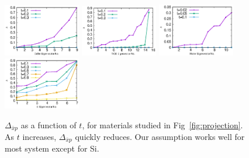 \documentclass[aps,prl,twocolumn,reprint,amsmath,amssymb]{revtex4-1}
\begin{document}
\begin{figure}
\centering
\includegraphics[width=0.3\textwidth]{t_cdse_residue}
\includegraphics[width=0.3\textwidth]{t_tio2_residue}
\includegraphics[width=0.3\textwidth]{t_water_residue}
\includegraphics[width=0.3\textwidth]{t_si_residue}
\caption{$\Delta_{\bar{x}p}$ as a function of $t$, for materials studied in Fig~\ref{fig:projection}. As $t$ increases, $\Delta_{\bar{x}p}$ quickly reduces. Our assumption works well for most system except for Si.}
\label{sfig:t_delta}
\end{figure}
\end{document}
